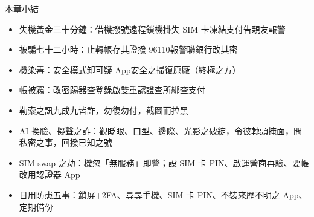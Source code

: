 \begin{tcbsummary}{本章小結}
\begin{itemize}
  \item 失機黃金三十分鐘：借機撥號遠程鎖機掛失 SIM 卡凍結支付告親友報警
  \item 被騙七十二小時：止轉帳存其證撥 96110報警聯銀行改其密
  \item 機染毒：安全模式卸可疑 App安全之掃復原廠（終極之方）
  \item 帳被竊：改密踢器查登錄啟雙重認證查所綁查支付
  \item 勒索之訊九成九皆詐，勿復勿付，截圖而拉黑
  \item AI 換臉、擬聲之詐：觀眨眼、口型、邊際、光影之破綻，令彼轉頭掩面，問私密之事，回撥已知之號
  \item SIM swap 之劫：機忽「無服務」即警；設 SIM 卡 PIN、啟運營商再驗、要帳改用認證器 App
  \item 日用防患五事：鎖屏+2FA、尋尋手機、SIM 卡 PIN、不裝來歷不明之 App、定期備份
\end{itemize}

\end{tcbsummary}
